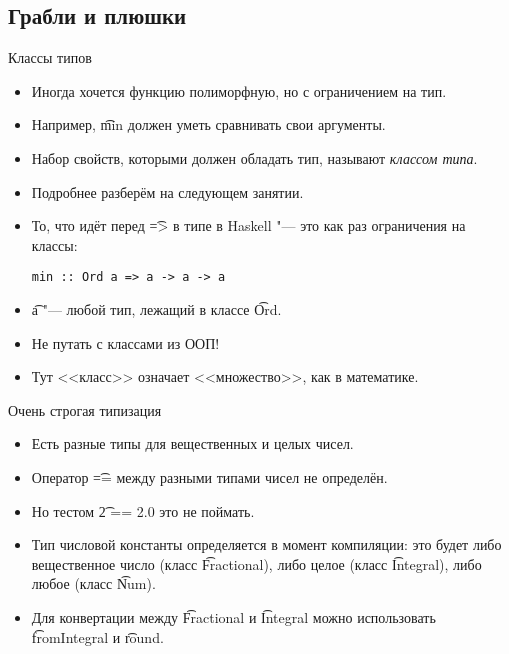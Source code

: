 \subsection{Грабли и плюшки}

\begin{frame}
\end{frame}

\begin{frame}[fragile]{Классы типов}
	\begin{itemize}
		\item Иногда хочется функцию полиморфную, но с ограничением на тип.
		\item Например, \t{min} должен уметь сравнивать свои аргументы.
		\item Набор свойств, которыми должен обладать тип, называют \textit{классом типа}.
		\item Подробнее разберём на следующем занятии.
		\item То, что идёт перед \t{=>} в типе в Haskell "--- это как раз ограничения на классы:
\begin{verbatim}
min :: Ord a => a -> a -> a
\end{verbatim}
		\item \t{a} "--- любой тип, лежащий в классе \t{Ord}.
		\item Не путать с классами из ООП!
		\item Тут <<класс>> означает <<множество>>, как в математике.
	\end{itemize}
\end{frame}

\begin{frame}{Очень строгая типизация}
	\begin{itemize}
		\item Есть разные типы для вещественных и целых чисел.
		\item Оператор \t{==} между разными типами чисел не определён.
		\item Но тестом \t{2 == 2.0} это не поймать.
		\item Тип числовой константы определяется в момент компиляции: это будет либо вещественное число (класс \t{Fractional}), либо целое (класс \t{Integral}), либо любое (класс \t{Num}).
		\item Для конвертации между \t{Fractional} и \t{Integral} можно использовать \t{fromIntegral} и \t{round}.
	\end{itemize}
\end{frame}

